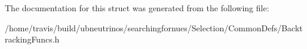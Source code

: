 The documentation for this struct was generated from the following file\-:\begin{DoxyCompactItemize}
\item 
/home/travis/build/ubneutrinos/searchingfornues/\-Selection/\-Common\-Defs/Backtracking\-Funcs.\-h\end{DoxyCompactItemize}
